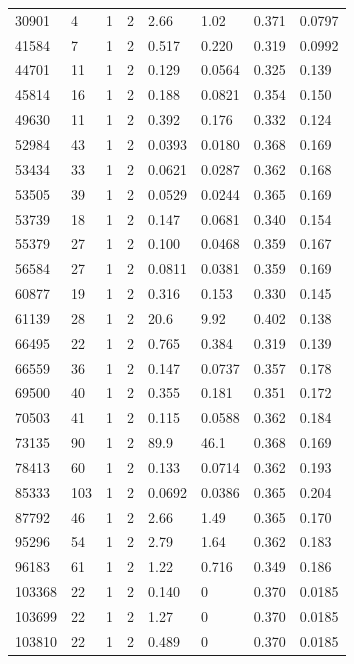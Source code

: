 \documentclass[preview]{standalone}
\begin{document}
{{{{{{{{{{{{{{{{{{{\begin{tabular}{L{1.2cm}C{1.2cm} C{0.3cm}C{0.5cm} C{1.4cm}C{1.4cm} C{1.4cm}C{1.4cm}}
  30901  &     4  & 1     &  2 &  2.66  & 1.02  & 0.371 &  0.0797   \\ 
  41584  &     7  & 1     &  2 &  0.517  & 0.220  & 0.319 &  0.0992   \\ 
  44701  &    11  & 1     &  2 &  0.129  & 0.0564  & 0.325 &  0.139   \\ 
  45814  &    16  & 1     &  2 &  0.188  & 0.0821  & 0.354 &  0.150   \\ 
  49630  &    11  & 1     &  2 &  0.392  & 0.176  & 0.332 &  0.124   \\ 
  52984  &    43  & 1     &  2 &  0.0393  & 0.0180  & 0.368 &  0.169   \\ 
  53434  &    33  & 1     &  2 &  0.0621  & 0.0287  & 0.362 &  0.168   \\ 
  53505  &    39  & 1     &  2 &  0.0529  & 0.0244  & 0.365 &  0.169   \\ 
  53739  &    18  & 1     &  2 &  0.147  & 0.0681  & 0.340 &  0.154   \\ 
  55379  &    27  & 1     &  2 &  0.100  & 0.0468  & 0.359 &  0.167   \\ 
  56584  &    27  & 1     &  2 &  0.0811  & 0.0381  & 0.359 &  0.169   \\ 
  60877  &    19  & 1     &  2 &  0.316  & 0.153  & 0.330 &  0.145   \\ 
  61139  &    28  & 1     &  2 &  20.6  & 9.92  & 0.402 &  0.138   \\ 
  66495  &    22  & 1     &  2 &  0.765  & 0.384  & 0.319 &  0.139   \\ 
  66559  &    36  & 1     &  2 &  0.147  & 0.0737  & 0.357 &  0.178   \\ 
  69500  &    40  & 1     &  2 &  0.355  & 0.181  & 0.351 &  0.172   \\ 
  70503  &    41  & 1     &  2 &  0.115  & 0.0588  & 0.362 &  0.184   \\ 
  73135  &    90  & 1     &  2 &  89.9  & 46.1  & 0.368 &  0.169   \\ 
  78413  &    60  & 1     &  2 &  0.133  & 0.0714  & 0.362 &  0.193   \\ 
  85333  &   103  & 1     &  2 &  0.0692  & 0.0386  & 0.365 &  0.204   \\ 
  87792  &    46  & 1     &  2 &  2.66  & 1.49  & 0.365 &  0.170   \\ 
  95296  &    54  & 1     &  2 &  2.79  & 1.64  & 0.362 &  0.183   \\ 
  96183  &    61  & 1     &  2 &  1.22  & 0.716  & 0.349 &  0.186   \\ 
  103368  &    22  & 1     &  2 &  0.140  & 0  & 0.370 &  0.0185   \\ 
  103699  &    22  & 1     &  2 &  1.27  & 0  & 0.370 &  0.0185   \\ 
  103810  &    22  & 1     &  2 &  0.489  & 0  & 0.370 &  0.0185   \\ 
\hline 
\end{tabular} 

}}}}}}}}}}}}}}}}}}}
\end{document}
